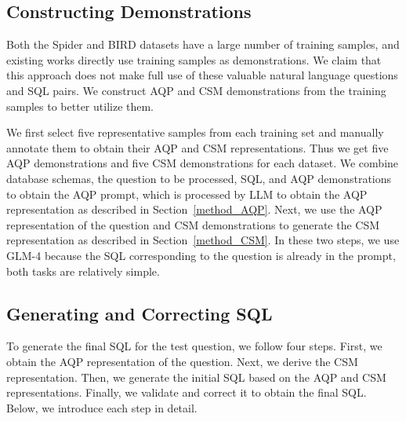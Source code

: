 \subsection{Constructing Demonstrations}

Both the Spider and BIRD datasets have a large number of training samples, and existing works directly use training samples as demonstrations. 
We claim that this approach does not make full use of these valuable natural language questions and SQL pairs.
We construct AQP and CSM demonstrations from the training samples to better utilize them.

We first select five representative samples from each training set and manually annotate them to obtain their AQP and CSM representations. Thus we get five AQP demonstrations and five CSM demonstrations for each dataset.
We combine database schemas, the question to be processed, SQL, and AQP demonstrations to obtain the AQP prompt, which is processed by LLM to obtain the AQP representation as described in Section~\ref{method_AQP}.
Next, we use the AQP representation of the question and CSM demonstrations to generate the CSM representation as described in Section~\ref{method_CSM}.
In these two steps, we use GLM-4 because the SQL corresponding to the question is already in the prompt, both tasks are relatively simple.

\subsection{Generating and Correcting SQL}

To generate the final SQL for the test question, we follow four steps. First, we obtain the AQP representation of the question. Next, we derive the CSM representation. Then, we generate the initial SQL based on the AQP and CSM representations. Finally, we validate and correct it to obtain the final SQL. Below, we introduce each step in detail.



